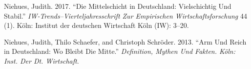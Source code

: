 \documentclass[12pt,]{article}
\begin{document}
\hypertarget{ref-niehues2017mittelschicht}{}
Niehues, Judith. 2017. ``Die Mittelschicht in Deutschland: Vielschichtig
Und Stabil.'' \emph{IW-Trends--Vierteljahresschrift Zur Empirischen
Wirtschaftsforschung} 44 (1). Köln: Institut der deutschen Wirtschaft
Köln (IW): 3--20.

\hypertarget{ref-niehues2013arm}{}
Niehues, Judith, Thilo Schaefer, and Christoph Schröder. 2013. ``Arm Und
Reich in Deutschland: Wo Bleibt Die Mitte.'' \emph{Definition, Mythen
Und Fakten. Köln: Inst. Der Dt. Wirtschaft}.
\end{document}
